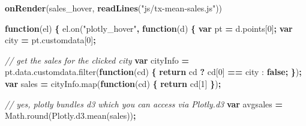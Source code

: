 \documentclass[
  12pt,
]{krantz}
\newenvironment{Shaded}{\begin{snugshade}}{\end{snugshade}}
\newcommand{\AttributeTok}[1]{\textcolor[rgb]{0.77,0.63,0.00}{#1}}
\newcommand{\CommentTok}[1]{\textcolor[rgb]{0.56,0.35,0.01}{\textit{#1}}}
\newcommand{\ControlFlowTok}[1]{\textcolor[rgb]{0.13,0.29,0.53}{\textbf{#1}}}
\newcommand{\DecValTok}[1]{\textcolor[rgb]{0.00,0.00,0.81}{#1}}
\newcommand{\KeywordTok}[1]{\textcolor[rgb]{0.13,0.29,0.53}{\textbf{#1}}}
\newcommand{\NormalTok}[1]{#1}
\newcommand{\OperatorTok}[1]{\textcolor[rgb]{0.81,0.36,0.00}{\textbf{#1}}}
\newcommand{\StringTok}[1]{\textcolor[rgb]{0.31,0.60,0.02}{#1}}
\newcommand{\VariableTok}[1]{\textcolor[rgb]{0.00,0.00,0.00}{#1}}
\begin{document}
\begin{Shaded}
\begin{Highlighting}[]
\KeywordTok{onRender}\NormalTok{(sales_hover, }\KeywordTok{readLines}\NormalTok{(}\StringTok{"js/tx-mean-sales.js"}\NormalTok{))}
\end{Highlighting}
\end{Shaded}

\begin{Shaded}
\begin{Highlighting}[]
\KeywordTok{function}\NormalTok{(el) }\OperatorTok{\{}
  \VariableTok{el}\NormalTok{.}\AttributeTok{on}\NormalTok{(}\StringTok{"plotly_hover"}\OperatorTok{,} \KeywordTok{function}\NormalTok{(d) }\OperatorTok{\{}
    \KeywordTok{var}\NormalTok{ pt }\OperatorTok{=} \VariableTok{d}\NormalTok{.}\AttributeTok{points}\NormalTok{[}\DecValTok{0}\NormalTok{]}\OperatorTok{;}
    \KeywordTok{var}\NormalTok{ city }\OperatorTok{=} \VariableTok{pt}\NormalTok{.}\AttributeTok{customdata}\NormalTok{[}\DecValTok{0}\NormalTok{]}\OperatorTok{;}

    \CommentTok{// get the sales for the clicked city}
    \KeywordTok{var}\NormalTok{ cityInfo }\OperatorTok{=} \VariableTok{pt}\NormalTok{.}\VariableTok{data}\NormalTok{.}\VariableTok{customdata}\NormalTok{.}\AttributeTok{filter}\NormalTok{(}\KeywordTok{function}\NormalTok{(cd) }\OperatorTok{\{}
      \ControlFlowTok{return}\NormalTok{ cd }\OperatorTok{?}\NormalTok{ cd[}\DecValTok{0}\NormalTok{] }\OperatorTok{==}\NormalTok{ city : }\KeywordTok{false}\OperatorTok{;}
    \OperatorTok{\}}\NormalTok{)}\OperatorTok{;}
    \KeywordTok{var}\NormalTok{ sales }\OperatorTok{=} \VariableTok{cityInfo}\NormalTok{.}\AttributeTok{map}\NormalTok{(}\KeywordTok{function}\NormalTok{(cd) }\OperatorTok{\{} \ControlFlowTok{return}\NormalTok{ cd[}\DecValTok{1}\NormalTok{] }\OperatorTok{\}}\NormalTok{)}\OperatorTok{;}

    \CommentTok{// yes, plotly bundles d3 which you can access via Plotly.d3}
    \KeywordTok{var}\NormalTok{ avgsales }\OperatorTok{=} \VariableTok{Math}\NormalTok{.}\AttributeTok{round}\NormalTok{(}\VariableTok{Plotly}\NormalTok{.}\VariableTok{d3}\NormalTok{.}\AttributeTok{mean}\NormalTok{(sales))}\OperatorTok{;}


\end{Highlighting}
\end{Shaded}
\end{document}
